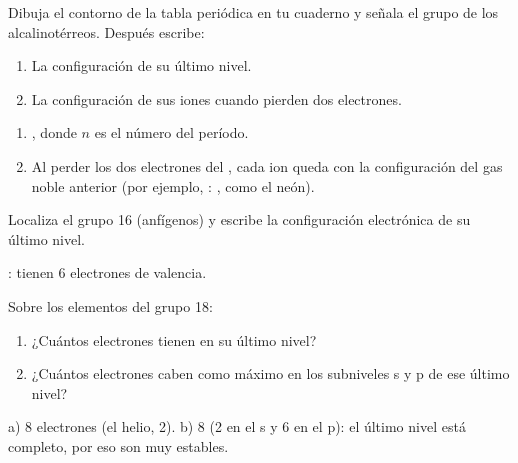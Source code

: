 \begin{exercise}
    Dibuja el contorno de la tabla periódica en tu cuaderno y señala el grupo de los alcalinotérreos. Después escribe:
    \begin{enumerate}[label=\alph*)]
        \item La configuración de su último nivel.
        \item La configuración de sus iones cuando pierden dos electrones.
    \end{enumerate}
    \begin{solu}
        \begin{enumerate}[label=\alph*)]
            \item {}, donde \(n\) es el número del período.
            \item Al perder los dos electrones del , cada ion queda con la configuración del gas noble anterior (por ejemplo, : , como el neón).
        \end{enumerate}
    \end{solu}
\end{exercise}

\begin{exercise}
    Localiza el grupo 16 (anfígenos) y escribe la configuración electrónica de su último nivel.
    \begin{solu}
        : tienen 6 electrones de valencia.
    \end{solu}
\end{exercise}

\begin{exercise}
    Sobre los elementos del grupo 18:
    \begin{enumerate}[label=\alph*)]
        \item ¿Cuántos electrones tienen en su último nivel?
        \item ¿Cuántos electrones caben como máximo en los subniveles s y p de ese último nivel?
    \end{enumerate}
    \begin{solu}
        a) 8 electrones (el helio, 2). b) 8 (2 en el s y 6 en el p): el último nivel está completo, por eso son muy estables.
    \end{solu}
\end{exercise}

